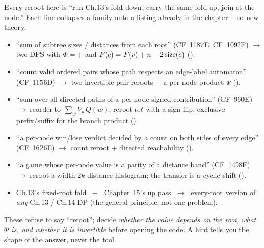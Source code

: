 
Every reroot here is ``run Ch.13's fold down, carry the same fold up, join at the
node.'' Each line collapses a family onto a listing already in the chapter -- no
new theory.

\begin{itemize}[nosep, leftmargin=1.4em]
  \item ``sum of subtree sizes / distances from each root'' (CF~1187E, CF~1092F)
        $\longrightarrow$ two-DFS with $\Phi=+$ and $F(c)=F(v)+n-2\operatorname{size}(c)$
        ().
  \item ``count valid ordered pairs whose path respects an edge-label automaton''
        (CF~1156D) $\longrightarrow$ two invertible pair reroots + a per-node
        product $\Psi$ ().
  \item ``sum over all directed paths of a per-node signed contribution'' (CF~960E)
        $\longrightarrow$ reorder to $\sum_w V_wQ(w)$, reroot $\mathit{tot}$ with a
        sign flip, exclusive prefix/suffix for the branch product
        ().
  \item ``a per-node win/lose verdict decided by a count on both sides of every
        edge'' (CF~1626E) $\longrightarrow$ count reroot + directed reachability
        ().
  \item ``a game whose per-node value is a parity of a distance band'' (CF~1498F)
        $\longrightarrow$ reroot a width-$2k$ distance histogram; the transfer is a
        cyclic shift ().
  \item Ch.13's fixed-root fold $\;+\;$ Chapter~15's up pass $\;\longrightarrow\;$
        every-root version of \emph{any} Ch.13 / Ch.14 DP (the general principle,
        not one problem).
\end{itemize}


These refuse to say ``reroot''; decide \emph{whether the value depends on the root,
what $\Phi$ is, and whether it is invertible} before opening the code. A hint tells
you the shape of the answer, never the tool.

